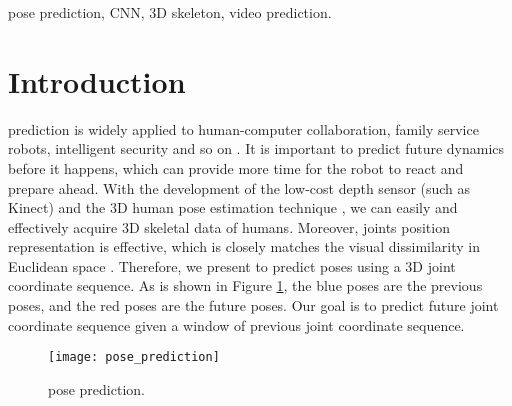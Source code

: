 \documentclass[journal]{IEEEtran}
\begin{document}
\begin{IEEEkeywords}
pose prediction, CNN, 3D skeleton, video prediction.
\end{IEEEkeywords}






\IEEEpeerreviewmaketitle



\section{Introduction}
 prediction is widely applied to human-computer collaboration, family service robots, intelligent security and so on \cite{APsurvey}. It is important to predict future dynamics before it happens, which can provide more time for the robot to react and prepare ahead. With the development of the low-cost depth sensor (such as Kinect) and the 3D human pose estimation technique \cite{HanKinect,Tome3DPE}, we can easily and effectively acquire 3D skeletal data of humans. Moreover, joints position representation is effective, which is closely matches the visual dissimilarity in Euclidean space \cite{HoldenDM}. Therefore, we present to predict poses using a 3D joint coordinate sequence. As is shown in Figure \ref{pp}, the blue poses are the previous poses, and the red poses are the future poses. Our goal is to predict future joint coordinate sequence given a window of previous joint coordinate sequence.

\begin{figure}[!t]
\centering
\texttt{[image: pose\_prediction]}
\caption{pose prediction.}
\label{pp}
\end{figure}
\end{document}
